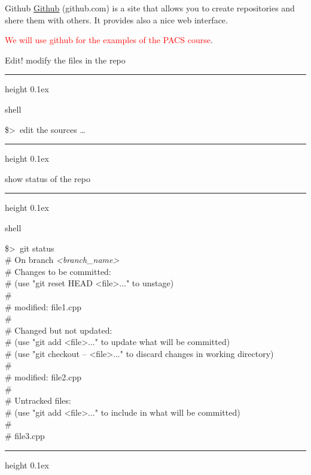 \documentclass{beamer}
\newenvironment{shell}{%
\footnotesize\flushleft\hrule height 0.1ex
\tt\begin{beamercolorbox}[sep=1ex,left]{shell}%
}{%
\end{beamercolorbox}
\hrule height 0.1ex
\endflushleft\par
}
\newcommand*{\tshell}[1]{{\usebeamercolor[fg]{shell}\colorbox{bg}{\tt#1}}}
\newcommand*{\psone}[1][ant]{\$>~}
\newcommand*{\var}[1]{{\it<#1>}}
\begin{document}
\begin{frame}{Github}
\href{https://github.com/}{Github} (github.com) is a site that allows you to create repositories and shere them with others. It provides also a nice web interface. 

\textcolor{red}{We will use github for the examples of the PACS course}. 

\end{frame}
%
\begin{frame}{Edit!}
modify the files in the repo
\begin{shell}
\psone edit the sources \ldots \\
\end{shell}
show status of the repo
\begin{shell}
\psone git status \\
\tiny%
\# On branch \var{branch_name} \\
\# Changes to be committed: \\
\#   (use "git reset HEAD <file>..." to unstage) \\
\# \\
\#       modified:   file1.cpp \\
\# \\
\# Changed but not updated: \\
\#   (use "git add <file>..." to update what will be committed) \\
\#   (use "git checkout -- <file>..." to discard changes in working directory) \\
\# \\
\#       modified:   file2.cpp \\
\# \\
\# Untracked files: \\
\#   (use "git add <file>..." to include in what will be committed) \\
\# \\
\#       file3.cpp \\
\end{shell}
\end{frame}
\end{document}
